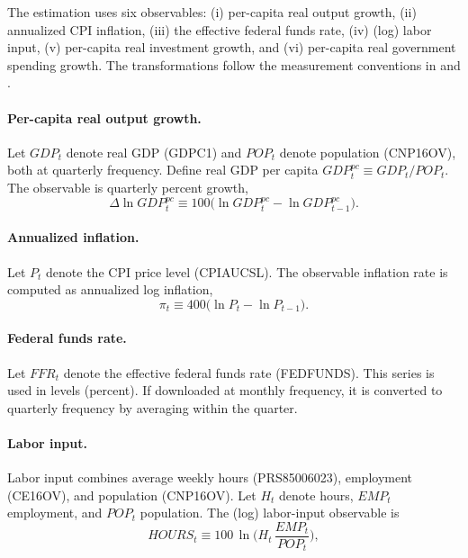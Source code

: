 The estimation uses six observables: (i) per-capita real output growth, (ii) annualized CPI inflation, (iii) the effective federal funds rate, (iv) (log) labor input, (v) per-capita real investment growth, and (vi) per-capita real government spending growth. The transformations follow the measurement conventions in \citet{smetsShocksFrictionsUS2007} and \citet{justinianoInvestmentShocksBusiness2010}.

\paragraph{Per-capita real output growth.}
Let $GDP_t$ denote real GDP (GDPC1) and $POP_t$ denote population (CNP16OV), both at quarterly frequency. Define real GDP per capita $GDP^{pc}_t \equiv GDP_t/POP_t$. The observable is quarterly percent growth,
\begin{equation}
	\Delta \ln GDP^{pc}_t \equiv 100\big(\ln GDP^{pc}_t - \ln GDP^{pc}_{t-1}\big).
\end{equation}

\paragraph{Annualized inflation.}
Let $P_t$ denote the CPI price level (CPIAUCSL). The observable inflation rate is computed as annualized log inflation,
\begin{equation}
	\pi_t \equiv 400\big(\ln P_t - \ln P_{t-1}\big).
\end{equation}

\paragraph{Federal funds rate.}
Let $FFR_t$ denote the effective federal funds rate (FEDFUNDS). This series is used in levels (percent). If downloaded at monthly frequency, it is converted to quarterly frequency by averaging within the quarter.

\paragraph{Labor input.}
Labor input combines average weekly hours (PRS85006023), employment (CE16OV), and population (CNP16OV). Let $H_t$ denote hours, $EMP_t$ employment, and $POP_t$ population. The (log) labor-input observable is
\begin{equation}
	HOURS_t \equiv 100\,\ln\Big( H_t\,\frac{EMP_t}{POP_t} \Big),
\end{equation}

